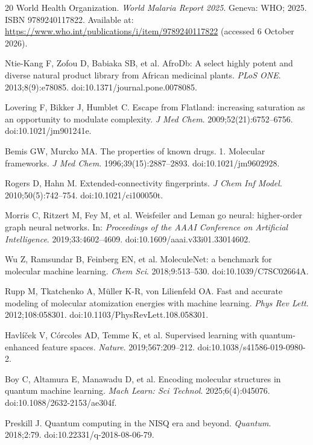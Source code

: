 \documentclass[11pt,a4paper]{article}
\begin{document}
\clearpage
{}
{}
\begin{thebibliography}{20}
World Health Organization.
\textit{World Malaria Report 2025}.
Geneva: WHO; 2025.
ISBN 9789240117822.
Available at: \url{https://www.who.int/publications/i/item/9789240117822} (accessed 6 October 2026).

Ntie-Kang F, Zofou D, Babiaka SB, et al.
AfroDb: A select highly potent and diverse natural product library from African medicinal plants.
\textit{PLoS ONE}. 2013;8(9):e78085.
doi:10.1371/journal.pone.0078085.

Lovering F, Bikker J, Humblet C.
Escape from Flatland: increasing saturation as an opportunity to modulate complexity.
\textit{J Med Chem}. 2009;52(21):6752--6756.
doi:10.1021/jm901241e.

Bemis GW, Murcko MA.
The properties of known drugs. 1. Molecular frameworks.
\textit{J Med Chem}. 1996;39(15):2887--2893.
doi:10.1021/jm9602928.

Rogers D, Hahn M.
Extended-connectivity fingerprints.
\textit{J Chem Inf Model}. 2010;50(5):742--754.
doi:10.1021/ci100050t.

Morris C, Ritzert M, Fey M, et al.
Weisfeiler and Leman go neural: higher-order graph neural networks.
In: \textit{Proceedings of the AAAI Conference on Artificial Intelligence}. 2019;33:4602--4609.
doi:10.1609/aaai.v33i01.33014602.

Wu Z, Ramsundar B, Feinberg EN, et al.
MoleculeNet: a benchmark for molecular machine learning.
\textit{Chem Sci}. 2018;9:513--530.
doi:10.1039/C7SC02664A.

Rupp M, Tkatchenko A, M\"uller K-R, von Lilienfeld OA.
Fast and accurate modeling of molecular atomization energies with machine learning.
\textit{Phys Rev Lett}. 2012;108:058301.
doi:10.1103/PhysRevLett.108.058301.

Havl\'{i}\v{c}ek V, C\'{o}rcoles AD, Temme K, et al.
Supervised learning with quantum-enhanced feature spaces.
\textit{Nature}. 2019;567:209--212.
doi:10.1038/s41586-019-0980-2.

Boy C, Altamura E, Manawadu D, et al.
Encoding molecular structures in quantum machine learning.
\textit{Mach Learn: Sci Technol}. 2025;6(4):045076.
doi:10.1088/2632-2153/ae304f.

Preskill J.
Quantum computing in the NISQ era and beyond.
\textit{Quantum}. 2018;2:79.
doi:10.22331/q-2018-08-06-79.


\end{thebibliography}
\end{document}
